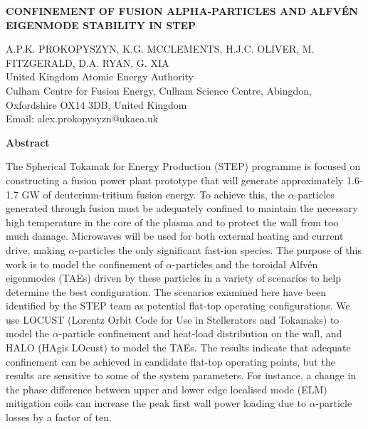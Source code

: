 \documentclass[10pt, a4paper, twoside]{article}
\begin{document}
\begin{flushleft}
\fontsize{12}{14}\selectfont \textbf{CONFINEMENT OF FUSION ALPHA-PARTICLES AND ALFV\'EN EIGENMODE STABILITY IN STEP}

\fontsize{10}{13}\selectfont
A.P.K. PROKOPYSZYN, K.G. MCCLEMENTS, H.J.C. OLIVER, M. FITZGERALD, D.A. RYAN, G. XIA \\
United Kingdom Atomic Energy Authority \\
Culham Centre for Fusion Energy, Culham Science Centre, Abingdon, Oxfordshire OX14 3DB, United Kingdom \\
Email: alex.prokopysyzn@ukaea.uk

\end{flushleft}

\begin{flushleft}
\textbf{Abstract}
\end{flushleft}

\setlength{\parindent}{1cm}
\fontsize{9}{12pt}\selectfont

The Spherical Tokamak for Energy Production (STEP) programme is focused on constructing a fusion power plant prototype that will generate approximately 1.6-1.7 GW of deuterium-tritium fusion energy. To achieve this, the $\alpha$-particles generated through fusion must be adequately confined to maintain the necessary high temperature in the core of the plasma and to protect the wall from too much damage. Microwaves will be used for both external heating and current drive, making $\alpha$-particles the only significant fast-ion species. The purpose of this work is to model the confinement of $\alpha$-particles and the toroidal Alfvén eigenmodes (TAEs) driven by these particles in a variety of scenarios to help determine the best configuration. The scenarios examined here have been identified by the STEP team as potential flat-top operating configurations. We use LOCUST (Lorentz Orbit Code for Use in Stellerators and Tokamaks) to model the $\alpha$-particle confinement and heat-load distribution on the wall, and HALO (HAgis LOcust) to model the TAEs. The results indicate that adequate confinement can be achieved in candidate flat-top operating points, but the results are sensitive to some of the system parameters. For instance, a change in the phase difference between upper and lower edge localised mode (ELM) mitigation coils can increase the peak first wall power loading due to $\alpha$-particle losses by a factor of ten.
\end{document}
